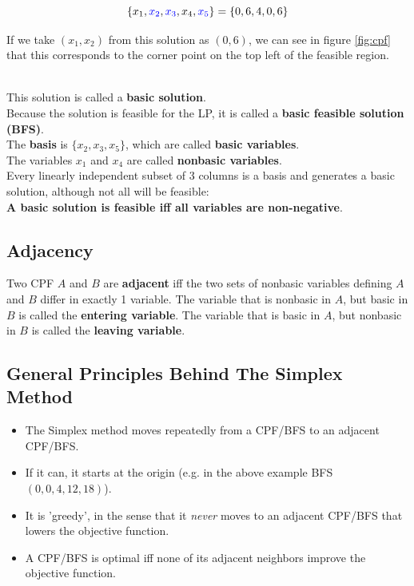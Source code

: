 \documentclass[12pt]{article}
\begin{document}
\[ \{ x_1, \textcolor{blue}{x_2}, \textcolor{blue}{x_3}, x_4, \textcolor{blue}{x_5} \} = \{ 0, 6, 4, 0, 6 \} \]

\noindent
If we take $(x_1, x_2)$ from this solution as $(0, 6)$, we can see in figure \ref{fig:cpf} that this corresponds to the corner point on the top left of the feasible region.

\noindent
\\
This solution is called a \textbf{basic solution}.\\
Because the solution is feasible for the LP, it is called a \textbf{basic feasible solution (BFS)}.\\
The \textbf{basis} is $\{ x_2, x_3, x_5 \}$, which are called \textbf{basic variables}.\\
The variables $x_1$ and $x_4$ are called \textbf{nonbasic variables}.\\
Every linearly independent subset of 3 columns is a basis and generates a basic solution, although not all will be feasible:\\
\textbf{A basic solution is feasible iff all variables are non-negative}.

\subsection*{Adjacency}
Two CPF $A$ and $B$ are \textbf{adjacent} iff the two sets of nonbasic variables defining $A$ and $B$ differ in exactly 1 variable.
The variable that is nonbasic in $A$, but basic in $B$ is called the \textbf{entering variable}.
The variable that is basic in $A$, but nonbasic in $B$ is called the \textbf{leaving variable}.

\subsection*{General Principles Behind The Simplex Method}

\begin{itemize}
    \item The Simplex method moves repeatedly from a CPF/BFS to an adjacent CPF/BFS.
    \item If it can, it starts at the origin (e.g. in the above example BFS $(0, 0, 4, 12, 18)$).
    \item It is 'greedy', in the sense that it \textit{never} moves to an adjacent CPF/BFS that lowers the objective function.
    \item A CPF/BFS is optimal iff none of its adjacent neighbors improve the objective function.
\end{itemize}
\end{document}
